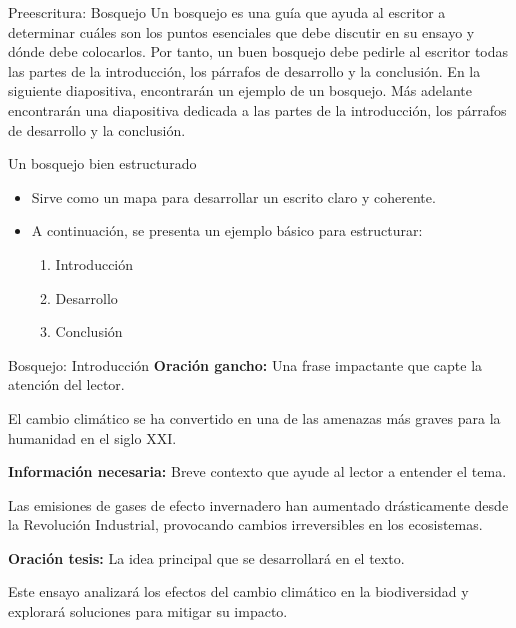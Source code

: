 \documentclass[
11pt, %
]{beamer}
\begin{document}
\begin{frame}{Preescritura: Bosquejo}
	Un bosquejo es una guía que ayuda al escritor a determinar cuáles
	son los puntos esenciales que debe discutir en su ensayo y dónde
	debe colocarlos. Por tanto, un buen bosquejo debe pedirle al
	escritor todas las partes de la introducción, los párrafos de
	desarrollo y la conclusión. En la siguiente diapositiva, encontrarán
	un ejemplo de un bosquejo. Más adelante encontrarán una
	diapositiva dedicada a las partes de la introducción, los párrafos de
	desarrollo y la conclusión.
\end{frame}

\begin{frame}{Un bosquejo bien estructurado}
	\begin{itemize}
		\item Sirve como un mapa para desarrollar un escrito claro y coherente.
		\item A continuación, se presenta un ejemplo básico para estructurar:
		      \begin{enumerate}
			      \item Introducción
			      \item Desarrollo
			      \item Conclusión
		      \end{enumerate}
	\end{itemize}
\end{frame}

\begin{frame}{Bosquejo: Introducción}
	\textbf{Oración gancho:} Una frase impactante que capte la atención del lector.
	\begin{block}{}
		El cambio climático se ha convertido en una de las amenazas más graves para la humanidad en el siglo XXI.
	\end{block}

	\textbf{Información necesaria:} Breve contexto que ayude al lector a entender el tema.
	\begin{block}{}
		Las emisiones de gases de efecto invernadero han aumentado drásticamente desde la Revolución Industrial, provocando cambios irreversibles en los ecosistemas.
	\end{block}

	\textbf{Oración tesis:} La idea principal que se desarrollará en el texto.
	\begin{block}{}
		Este ensayo analizará los efectos del cambio climático en la biodiversidad y explorará soluciones para mitigar su impacto.
	\end{block}

\end{frame}
\end{document}
